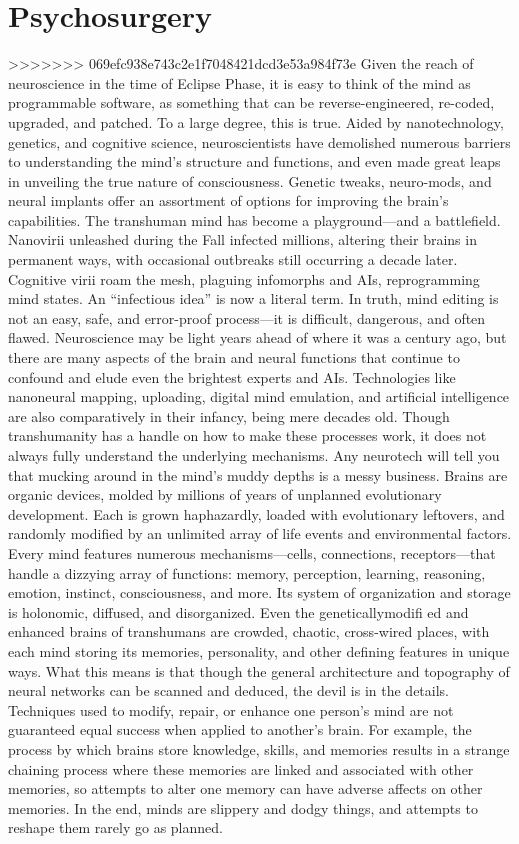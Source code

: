 \section{Psychosurgery}
>>>>>>> 069efc938e743c2e1f7048421dcd3e53a984f73e
Given the reach of neuroscience in the time of
Eclipse Phase, it is easy to think of the mind as
programmable software, as something that can be
reverse-engineered, re-coded, upgraded, and patched.
To a large degree, this is true. Aided by nanotechnology,
genetics, and cognitive science, neuroscientists
have demolished numerous barriers to understanding
the mind’s structure and functions, and even
made great leaps in unveiling the true nature of
consciousness. Genetic tweaks, neuro-mods, and
neural implants offer an assortment of options for
improving the brain’s capabilities. The transhuman
mind has become a playground—and a battlefield.
Nanovirii unleashed during the Fall infected millions,
altering their brains in permanent ways, with
occasional outbreaks still occurring a decade later.
Cognitive virii roam the mesh, plaguing infomorphs
and AIs, reprogramming mind states. An “infectious
idea” is now a literal term.
In truth, mind editing is not an easy, safe, and
error-proof process—it is difficult, dangerous, and
often flawed. Neuroscience may be light years
ahead of where it was a century ago, but there are
many aspects of the brain and neural functions
that continue to confound and elude even the
brightest experts and AIs. Technologies like nanoneural
mapping, uploading, digital mind emulation,
and artificial intelligence are also comparatively
in their infancy, being mere decades old. Though
transhumanity has a handle on how to make these
processes work, it does not always fully understand
the underlying mechanisms.
Any neurotech will tell you that mucking around
in the mind’s muddy depths is a messy business.
Brains are organic devices, molded by millions of
years of unplanned evolutionary development. Each
is grown haphazardly, loaded with evolutionary
leftovers, and randomly modified by an unlimited
array of life events and environmental factors. Every
mind features numerous mechanisms—cells, connections,
receptors—that handle a dizzying array
of functions: memory, perception, learning, reasoning,
emotion, instinct, consciousness, and more. Its
system of organization and storage is holonomic,
diffused, and disorganized. Even the geneticallymodifi
ed and enhanced brains of transhumans are
crowded, chaotic, cross-wired places, with each
mind storing its memories, personality, and other
defining features in unique ways.
What this means is that though the general architecture
and topography of neural networks can
be scanned and deduced, the devil is in the details.
Techniques used to modify, repair, or enhance one
person’s mind are not guaranteed equal success
when applied to another’s brain. For example, the
process by which brains store knowledge, skills, and
memories results in a strange chaining process where
these memories are linked and associated with other
memories, so attempts to alter one memory can
have adverse affects on other memories. In the end,
minds are slippery and dodgy things, and attempts
to reshape them rarely go as planned.

